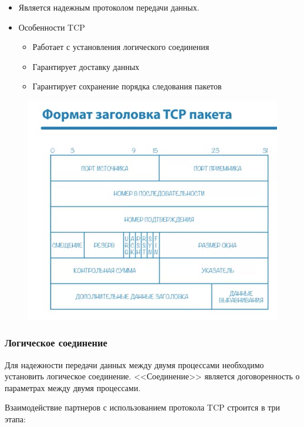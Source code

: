\documentclass[a4paper,12pt]{article}
\begin{document}
	\begin{itemize}
		\item Является надежным протоколом передачи данных.
		\item Особенности TCP
		\begin{itemize}
			\item Работает с установления логического соединения
			\item Гарантирует доставку данных
			\item Гарантирует сохранение порядка следования пакетов
		\end{itemize}
	\end{itemize}
		
	\begin{figure}[h!]
		\begin{center}
			{\includegraphics[scale = 1]{6.png}}
			\label{6}
		\end{center}
	\end{figure}

	\subsubsection{Логическое соединение}
	
	Для надежности передачи данных между двумя процессами необходимо установить логическое соединение. <<Соединение>> является договоренность о параметрах между двумя процессами.
	
	Взаимодействие партнеров с использованием протокола TCP строится в три этапа:
	
\end{document}
